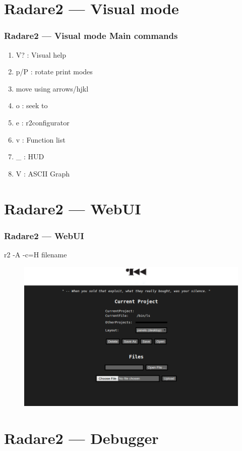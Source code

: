 \documentclass[10pt, compress]{beamer}
\begin{document}
\section{Radare2 — Visual mode}
\begin{frame}[fragile]
  \frametitle{Radare2 — Visual mode Main commands}
  \begin{enumerate}
  \item V? : Visual help
  \item p/P : rotate print modes
  \item move using arrows/hjkl
  \item o : seek to
  \item e : r2configurator
  \item v : Function list
  \item \_ : HUD
  \item V : ASCII Graph
 \end{enumerate}
\end{frame}

\section{Radare2 — WebUI}
\begin{frame}[fragile]
  \frametitle{Radare2 — WebUI}
  r2 -A -c=H filename
    \begin{figure}
  \includegraphics[width=\textwidth]{web.png}
  \end{figure}
\end{frame}

\section{Radare2 — Debugger}
\end{document}

